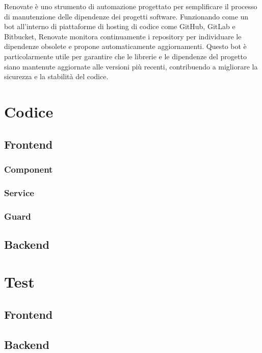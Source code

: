 \documentclass[12pt,a4paper,openright,twoside]{book}
\begin{document}
Renovate è uno strumento di automazione progettato per semplificare il processo di manutenzione delle dipendenze dei progetti software. Funzionando come un bot all'interno di piattaforme di hosting di codice come GitHub, GitLab e Bitbucket, Renovate monitora continuamente i repository per individuare le dipendenze obsolete e propone automaticamente aggiornamenti. Questo bot è particolarmente utile per garantire che le librerie e le dipendenze del progetto siano mantenute aggiornate alle versioni più recenti, contribuendo a migliorare la sicurezza e la stabilità del codice.

\chapter{Codice}

\section{Frontend}

\subsection{Component}

\subsection{Service}

\subsection{Guard}

\section{Backend}

\chapter{Test}

\section{Frontend}


\section{Backend}
\end{document}
